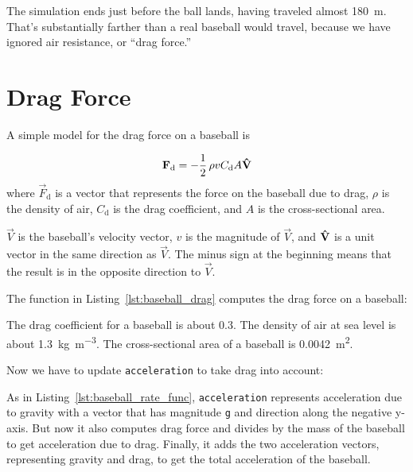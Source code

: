 The simulation ends just before the ball lands, having traveled almost \SI{180}{\meter}.  That's substantially farther than a real baseball would travel, because we have ignored air resistance, or ``drag force.''

\section{Drag Force}
\label{drag}


A simple model for the drag force on a baseball is

\begin{equation*}
    \vec{F}_\mathrm{d} = - \frac{1}{2} \, \rho v C_\mathrm{d} A \uvec{V}
\end{equation*}
where $\vec{F}_\mathrm{d}$ is a vector that represents the force on the baseball
due to drag,
$\rho$ is the density of air,
$C_\mathrm{d}$ is the drag coefficient, and
$A$ is the cross-sectional area.


$\vec{V}$ is the baseball's velocity vector, $v$ is the magnitude of $\vec{V}$, and $\uvec{V}$ is a unit vector in the same direction as $\vec{V}$.  The minus sign at the beginning means that the result is in the opposite direction to $\vec{V}$.


The function in Listing~\ref{lst:baseball_drag} computes the drag force on a baseball:



The drag coefficient for a baseball is about 0.3.
The density of air at sea level is about \SI{1.3}{\kilogram\per\meter\cubed}.
The cross-sectional area of a baseball is \SI{0.0042}{\meter\squared}.


Now we have to update \lstinline{acceleration} to take drag into account:



As in Listing~\ref{lst:baseball_rate_func}, \lstinline{acceleration} represents acceleration due to gravity with a vector that has magnitude \lstinline{g} and direction along the negative y-axis.
But now it also computes drag force and divides by the mass of the baseball to get acceleration due to drag.
Finally, it adds the two acceleration vectors, representing gravity and drag, to get the total acceleration of the baseball.


